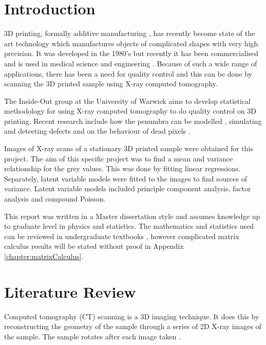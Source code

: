 \documentclass[12pt]{report}
\begin{document}
\tableofcontents

\chapter{Introduction}

3D printing, formally additive manufacturing \cite{wong2012review}, has recently become state of the art technology which manufactures objects of complicated shapes with very high precision. It was developed in the 1980's \cite{kodama1981automatic} but recently it has been commercialised and is used in medical science \cite{kang20163d} and engineering \cite{wong2012review}. Because of such a wide range of applications, there has been a need for quality control and this can be done by scanning the 3D printed sample using X-ray computed tomography.

The Inside-Out group at the University of Warwick aims to develop statistical methodology for using X-ray computed tomography to do quality control on 3D printing. Recent research include how the penumbra can be modelled \cite{kueh2014modelling}, simulating and detecting defects and on the behaviour of dead pixels \cite{brettschneider2014spatial}.

Images of X-ray scans of a stationary 3D printed sample were obtained for this project. The aim of this specific project was to find a mean and variance relationship for the grey values. This was done by fitting linear regressions. Separately, latent variable models were fitted to the images to find sources of variance. Latent variable models included principle component analysis, factor analysis and compound Poisson.

This report was written in a Master dissertation style and assumes knowledge up to graduate level in physics and statistics. The mathematics and statistics used can be reviewed in undergraduate textbooks \cite{riley2006mathematical} \cite{rice2009mathematical}, however complicated matrix calculus results will be stated without proof in Appendix \ref{chapter:matrixCalculus}.

\chapter{Literature Review}
Computed tomography (CT) scanning is a 3D imaging technique. It does this by reconstructing the geometry of the sample through a series of 2D X-ray images of the sample. The sample rotates after each image taken \cite{cantatore2011introduction}.
\end{document}
